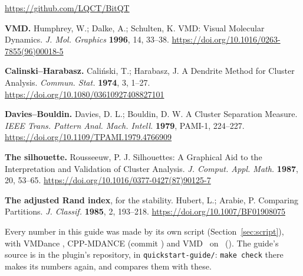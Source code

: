 \documentclass[11pt,letterpaper]{article}
\newcommand{\cmd}[1]{\texttt{#1}}
\begin{document}
{\begin{enumerate}[label={[\arabic*]},leftmargin=*,itemsep=0.3ex]
  \url{https://github.com/LQCT/BitQT}
\item \textbf{VMD.} Humphrey, W.; Dalke, A.; Schulten, K. VMD: Visual
  Molecular Dynamics. \emph{J. Mol. Graphics} \textbf{1996}, 14, 33--38.
  \url{https://doi.org/10.1016/0263-7855(96)00018-5}
\item \textbf{Calinski--Harabasz.} Cali\'nski, T.; Harabasz, J. A Dendrite
  Method for Cluster Analysis. \emph{Commun. Stat.} \textbf{1974}, 3, 1--27.
  \url{https://doi.org/10.1080/03610927408827101}
\item \textbf{Davies--Bouldin.} Davies, D. L.; Bouldin, D. W. A Cluster
  Separation Measure. \emph{IEEE Trans. Pattern Anal. Mach. Intell.}
  \textbf{1979}, PAMI-1, 224--227. \url{https://doi.org/10.1109/TPAMI.1979.4766909}
\item \textbf{The silhouette.} Rousseeuw, P. J. Silhouettes: A Graphical Aid to
  the Interpretation and Validation of Cluster Analysis. \emph{J. Comput.
  Appl. Math.} \textbf{1987}, 20, 53--65.
  \url{https://doi.org/10.1016/0377-0427(87)90125-7}
\item \textbf{The adjusted Rand index}, for the stability. Hubert, L.; Arabie,
  P. Comparing Partitions. \emph{J. Classif.} \textbf{1985}, 2, 193--218.
  \url{https://doi.org/10.1007/BF01908075}
\end{enumerate}
}

\vfill
{\footnotesize\color{muted}
Every number in this guide was made by its own script
(Section~\ref{sec:script}), with VMDance \qsVersion, CPP-MDANCE (commit
\qsBackendCommit) and VMD \qsVMD\ on \qsArch\ (\qsMachine). The guide's
source is in the plugin's repository, in \cmd{quickstart-guide/}: \cmd{make
check} there makes its numbers again, and compares them with these.\par}
\end{document}
